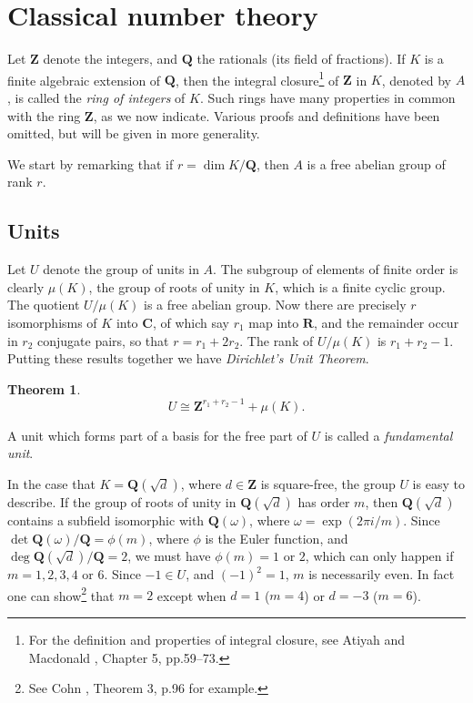 \documentclass[10pt]{article}
\newtheorem{theo}{Theorem}[subsection]
\theoremstyle{definition}
\def\ZZ{\mathbf{Z}}
\def\QQ{\mathbf{Q}}
\def\RR{\mathbf{R}}
\def\CC{\mathbf{C}}
\def\fnonth{For the definition and properties of integral closure, see Atiyah and Macdonald \cite{bib:17}, Chapter 5, pp.59--73.}
\def\fnonfo{See Cohn \cite{bib:36}, Theorem 3, p.96 for example.}
\begin{document}
\section{Classical number theory}
\label{ch:2}

Let $\ZZ$ denote the integers, and $\QQ$ the rationals (its field of fractions).
If $K$ is a finite algebraic extension of $\QQ$, then the integral closure\footnote{\fnonth} of $\ZZ$ in $K$, denoted by $A$, is called the \emph{ring of integers} of $K$.
Such rings have many properties in common with the ring $\ZZ$, as we now indicate.
Various proofs and definitions have been omitted, but will be given in more generality.

We start by remarking that if $r = \dim K/\QQ$, then $A$ is a free abelian group of rank $r$.


\subsection{Units}
\label{ch:2.1}

Let $U$ denote the group of units in $A$.
The subgroup of elements of finite order is clearly $\mu(K)$, the group of roots of unity in $K$, which is a finite cyclic group.
The quotient $U / \mu(K)$ is a free abelian group.
Now there are precisely $r$ isomorphisms of $K$ into $\CC$, of which say $r_1$ map into $\RR$, and the remainder occur in $r_2$ conjugate pairs, so that $r = r_1 + 2 r_2$.
The rank of $U / \mu(K)$ is $r_1 + r_2 - 1$.
Putting these results together we have \emph{Dirichlet's Unit Theorem}.


\begin{theo}
\label{2.1.1}
\[
U \cong \ZZ^{r_1 + r_2 - 1} + \mu(K).
\]
\end{theo}

A unit which forms part of a basis for the free part of $U$ is called a \emph{fundamental unit}.

In the case that $K = \QQ(\sqrt d)$, where $d \in \ZZ$ is square-free, the group $U$ is easy to describe.
If the group of roots of unity in $\QQ(\sqrt d)$ has order $m$, then $\QQ(\sqrt d)$ contains a subfield isomorphic with $\QQ(\omega)$, where $\omega = \exp(2 \pi i / m)$.
Since $\det \QQ(\omega) / \QQ = \phi(m)$, where $\phi$ is the Euler function, and $\deg \QQ(\sqrt d) / \QQ = 2$, we must have $\phi(m) = 1$ or $2$, which can only happen if $m = 1,2,3,4$ or $6$.
Since $-1 \in U$, and $(-1)^2 = 1$, $m$ is necessarily even.
In fact one can show\footnote{\fnonfo} that $m = 2$ except when $d = 1$ ($m = 4$) or $d = -3$ ($m = 6$).
\end{document}
